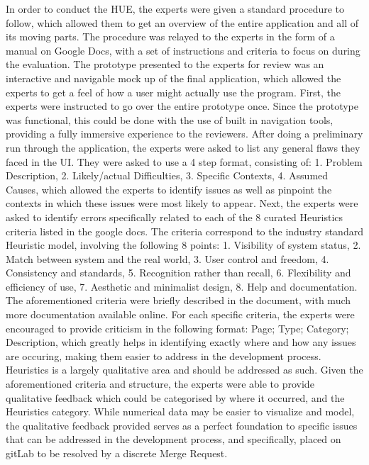 \documentclass[sigconf]{acmart}
\begin{document}
	In order to conduct the HUE, the experts were given a standard procedure to follow, which allowed them to get an overview of the entire application and all of its moving parts. The procedure was relayed to the experts in the form of a manual on Google Docs, with a set of instructions and criteria to focus on during the evaluation. The prototype presented to the experts for review was an interactive and navigable mock up of the final application, which allowed the experts to get a feel of how a user might actually use the program.
	First, the experts were instructed to go over the entire prototype once. Since the prototype was functional, this could be done with the use of built in navigation tools, providing a fully immersive experience to the reviewers. After doing a preliminary run through the application, the experts were asked to list any general flaws they faced in the UI. They were asked to use a 4 step format, consisting of: 1. Problem Description, 2. Likely/actual Difficulties, 3. Specific Contexts, 4. Assumed Causes, which allowed the experts to identify issues as well as pinpoint the contexts in which these issues were most likely to appear.
	Next, the experts were asked to identify errors specifically related to each of the 8 curated Heuristics criteria listed in the google docs. The criteria correspond to the industry standard Heuristic model, involving the following 8 points: 1. Visibility of system status, 2. Match between system and the real world, 3. User control and freedom, 4. Consistency and standards, 5.
Recognition rather than recall, 6. Flexibility and efficiency of use, 7. Aesthetic and minimalist design, 8. Help and documentation. The aforementioned criteria were briefly described in the document, with much more documentation available online. For each specific criteria, the experts were encouraged to provide criticism in the following format: Page; Type; Category; Description, which greatly helps in identifying exactly where and how any issues are occuring, making them easier to address in the development process.
	Heuristics is a largely qualitative area and should be addressed as such. Given the aforementioned criteria and structure, the experts were able to provide qualitative feedback which could be categorised by where it occurred, and the Heuristics category. While numerical data may be easier to visualize and model, the qualitative feedback provided serves as a perfect foundation to specific issues that can be addressed in the development process, and specifically, placed on gitLab to be resolved by a discrete Merge Request.










\end{document}
